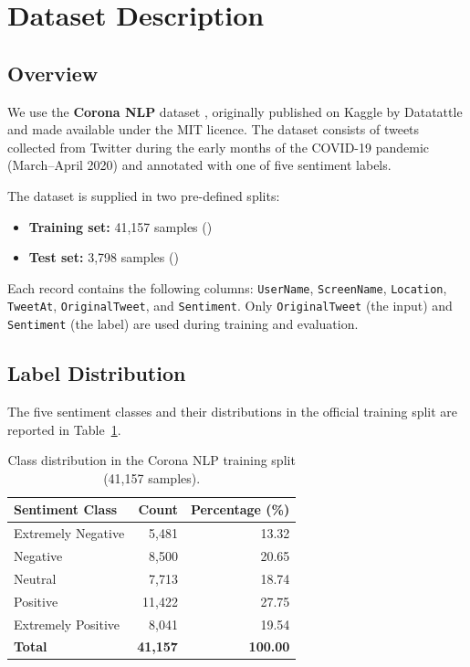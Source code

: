 \section{Dataset Description}

\subsection{Overview}

We use the \textbf{Corona NLP} dataset \cite{datatattle2020coronanlp}, originally published on Kaggle by Datatattle and made available under the MIT licence. The dataset consists of tweets collected from Twitter during the early months of the COVID-19 pandemic (March--April 2020) and annotated with one of five sentiment labels.

The dataset is supplied in two pre-defined splits:
\begin{itemize}
    \item \textbf{Training set:} 41,157 samples ()
    \item \textbf{Test set:} 3,798 samples ()
\end{itemize}

Each record contains the following columns: \texttt{UserName}, \texttt{ScreenName}, \texttt{Location}, \texttt{TweetAt}, \texttt{OriginalTweet}, and \texttt{Sentiment}. Only \texttt{OriginalTweet} (the input) and \texttt{Sentiment} (the label) are used during training and evaluation.

\subsection{Label Distribution}

The five sentiment classes and their distributions in the official training split are reported in Table~\ref{tab:class_distribution}.

\begin{table}[H]
    \centering
    \caption{Class distribution in the Corona NLP training split (41,157 samples).}
    \label{tab:class_distribution}
    \begin{tabularx}{\textwidth}{l r r}
        \toprule
        \textbf{Sentiment Class} & \textbf{Count} & \textbf{Percentage (\%)} \\
        \midrule
        Extremely Negative & 5,481  & 13.32 \\
        Negative           & 8,500  & 20.65 \\
        Neutral            & 7,713  & 18.74 \\
        Positive           & 11,422 & 27.75 \\
        Extremely Positive & 8,041  & 19.54 \\
        \midrule
        \textbf{Total}     & \textbf{41,157} & \textbf{100.00} \\
        \bottomrule
    \end{tabularx}
\end{table}

